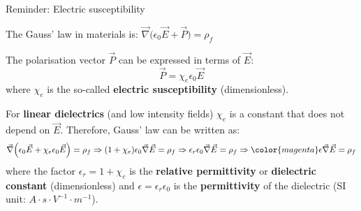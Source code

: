 {
\reminderslide

%
%
%

\begin{frame}{Reminder: Electric susceptibility}

The Gauss' law in materials is:
$\displaystyle \vec{\nabla} \Big( \epsilon_0 \vec{E} + \vec{P} \Big) = \rho_{f}$\\

\vspace{0.2cm}

The polarisation vector $\vec{P}$ can be expressed in terms of $\vec{E}$:
\begin{equation*}
  \vec{P} = \chi_e \epsilon_0 \vec{E}
\end{equation*}
where $\chi_e$ is the so-called {\bf electric susceptibility} (dimensionless).\\

\vspace{0.2cm}

For {\bf linear dielectrics} (and low intensity fields) $\chi_e$ is a
constant that does not depend on $\vec{E}$.
Therefore, Gauss' law can be written as:
\begin{equation*}
  \vec{\nabla} \Big( \epsilon_0 \vec{E} + \chi_e \epsilon_0 \vec{E} \Big) = \rho_{f} \Rightarrow
  (1+\chi_e) \epsilon_0 \vec{\nabla} \vec{E} = \rho_{f} \Rightarrow
  \epsilon_r \epsilon_0 \vec{\nabla} \vec{E} = \rho_{f} \Rightarrow
  {\color{magenta}
     \epsilon \vec{\nabla} \vec{E} =  \rho_{f}
  }
\end{equation*}
where the factor $\epsilon_r = 1+\chi_e$
is the {\bf relative permittivity} or {\bf dielectric constant} (dimensionless) and
$\epsilon = \epsilon_r  \epsilon_0$ is the {\bf permittivity} of the dielectric
(SI unit: $A \cdot s \cdot  V^{-1} \cdot m^{-1}$).\\

\end{frame}

} %

%
%
%

